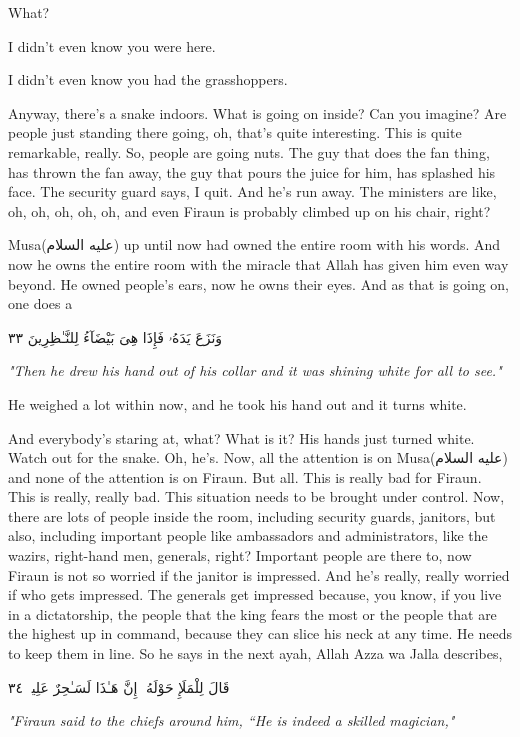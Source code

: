\documentclass[12pt]{article}
\newcommand{\as}{\textarabic{(عليه السلام)}}
\begin{document}
What? 

I didn't even know you were here. 

I didn't even know you had the grasshoppers. 

Anyway, there's a snake indoors. What is going on inside? Can you imagine? Are people just standing there going, oh, that's quite interesting. This is quite remarkable, really. So, people are going nuts. The guy that does the fan thing, has thrown the fan away, the guy that pours the juice for him, has splashed his face. The security guard says, I quit. And he's run away. The ministers are like, oh, oh, oh, oh, oh, and even Firaun is probably climbed up on his chair, right? 

Musa\as{} up until now had owned the entire room with his words. And now he owns the entire room with the miracle that Allah has given him even way beyond. He owned people's ears, now he owns their eyes. And as that is going on, one does a 

\textarabic{وَنَزَعَ يَدَهُۥ فَإِذَا هِىَ بَيْضَآءُ لِلنَّـٰظِرِينَ ٣٣}

\textit{"Then he drew his hand out of his collar and it was shining white for all to see."}

He weighed a lot within now, and he took his hand out and it turns white. 

And everybody's staring at, what? What is it? His hands just turned white. Watch out for the snake. Oh, he's. Now, all the attention is on Musa\as{} and none of the attention is on Firaun. But all. This is really bad for Firaun. This is really, really bad. This situation needs to be brought under control. Now, there are lots of people inside the room, including security guards, janitors, but also, including important people like ambassadors and administrators, like the wazirs, right-hand men, generals, right? Important people are there to, now Firaun is not so worried if the janitor is impressed. And he's really, really worried if who gets impressed. The generals get impressed because, you know, if you live in a dictatorship, the people that the king fears the most or the people that are the highest up in command, because they can slice his neck at any time. He needs to keep them in line. So he says in the next ayah, Allah Azza wa Jalla describes, 

\textarabic{قَالَ لِلْمَلَإِ حَوْلَهُۥٓ إِنَّ هَـٰذَا لَسَـٰحِرٌ عَلِيمٌۭ ٣٤}

\textit{"Firaun said to the chiefs around him, “He is indeed a skilled magician,"}
\end{document}
